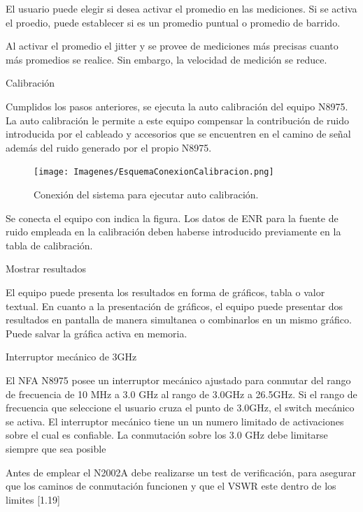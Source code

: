 	El usuario puede elegir si desea activar el promedio en las mediciones. Si se activa el proedio, puede establecer si es
	un promedio puntual o promedio de barrido.
	
	Al activar el promedio el jitter y se provee de mediciones más precisas cuanto más promedios se realice. Sin embargo, la
	velocidad de medición se reduce.
	
	Calibración
	
	Cumplidos los pasos anteriores, se ejecuta la auto calibración del equipo N8975. La auto calibración le permite a este
	equipo compensar la contribución de ruido introducida por el cableado y accesorios que se encuentren en el camino de
	señal además del ruido generado por el propio N8975.		
	
	\begin{figure}
		\centering
		\begin{minipage}{8.063cm}
			\texttt{[image: Imagenes/EsquemaConexionCalibracion.png]}
			\caption{Conexión del sistema para ejecutar auto calibración.}
		\end{minipage}
	\end{figure}
	Se conecta el equipo con indica la figura. Los datos de ENR para la fuente de ruido empleada en la calibración deben haberse introducido previamente en la tabla de calibración.
			
	Mostrar resultados
	
	El equipo puede presenta los resultados en forma de gráficos, tabla o valor textual. En cuanto a la presentación de	gráficos, el equipo puede presentar dos resultados en pantalla de manera simultanea o combinarlos en un mismo gráfico. Puede salvar la gráfica activa en memoria.
	
	Interruptor mecánico de 3GHz
	
	El NFA N8975 posee un interruptor mecánico ajustado para conmutar del rango de frecuencia de 10 MHz a 3.0 GHz al rango	de 3.0GHz a 26.5GHz. Si el rango de frecuencia que seleccione el usuario cruza el punto de 3.0GHz, el switch mecánico se activa. El interruptor mecánico tiene un un numero limitado de activaciones sobre el cual es confiable. La	conmutación sobre los 3.0 GHz debe limitarse siempre que sea posible
	
	Antes de emplear el N2002A debe realizarse un test de verificación, para asegurar que los caminos de conmutación	funcionen y que el VSWR este dentro de los limites [1.19]	

